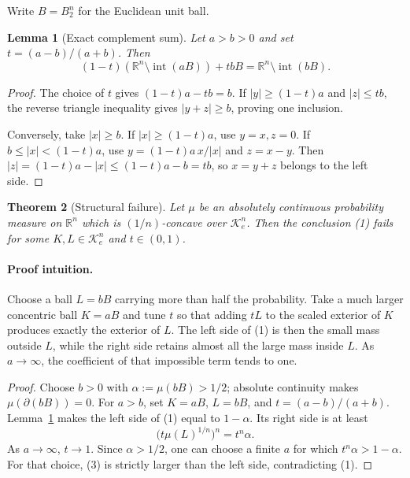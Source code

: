 \documentclass[11pt]{article}
\newtheorem{theorem}{Theorem}
\newtheorem{lemma}[theorem]{Lemma}
\newcommand{\R}{\mathbb R}
\begin{document}
Write \(B=B_2^n\) for the Euclidean unit ball.

\begin{lemma}[Exact complement sum]
\label{lem:set}
Let \(a>b>0\) and set \(t=(a-b)/(a+b)\).  Then
\[
 (1-t)(\R^n\setminus\operatorname{int}(aB))+tbB
 =\R^n\setminus\operatorname{int}(bB).
 \tag{2}
\]
\end{lemma}

\begin{proof}
The choice of \(t\) gives
\((1-t)a-tb=b\).  If \(|y|\ge(1-t)a\) and \(|z|\le tb\), the reverse
triangle inequality gives \(|y+z|\ge b\), proving one inclusion.

Conversely, take \(|x|\ge b\).  If \(|x|\ge(1-t)a\), use \(y=x,z=0\).
If \(b\le|x|<(1-t)a\), use
\(y=(1-t)a\,x/|x|\) and \(z=x-y\).  Then
\(|z|=(1-t)a-|x|\le(1-t)a-b=tb\), so \(x=y+z\) belongs to the left side.
\end{proof}

\begin{theorem}[Structural failure]
\label{thm:general}
Let \(\mu\) be an absolutely continuous probability measure on \(\R^n\)
which is \((1/n)\)-concave over \(\mathcal K_e^n\).  Then the conclusion
(1) fails for some \(K,L\in\mathcal K_e^n\) and \(t\in(0,1)\).
\end{theorem}

\paragraph{Proof intuition.}
Choose a ball \(L=bB\) carrying more than half the probability.  Take a much
larger concentric ball \(K=aB\) and tune \(t\) so that adding \(tL\) to the
scaled exterior of \(K\) produces exactly the exterior of \(L\).  The left
side of (1) is then the small mass outside \(L\), while the right side retains
almost all the large mass inside \(L\).  As \(a\to\infty\), the coefficient
of that impossible term tends to one.

\begin{proof}
Choose \(b>0\) with \(\alpha:=\mu(bB)>1/2\); absolute continuity makes
\(\mu(\partial(bB))=0\).  For \(a>b\), set
\(K=aB\), \(L=bB\), and \(t=(a-b)/(a+b)\).  Lemma~\ref{lem:set} makes the
left side of (1) equal to \(1-\alpha\).  Its right side is at least
\[
 \bigl(t\mu(L)^{1/n}\bigr)^n=t^n\alpha. \tag{3}
\]
As \(a\to\infty\), \(t\to1\).  Since \(\alpha>1/2\), one can choose a
finite \(a\) for which \(t^n\alpha>1-\alpha\).  For that choice, (3) is
strictly larger than the left side, contradicting (1).
\end{proof}
\end{document}
